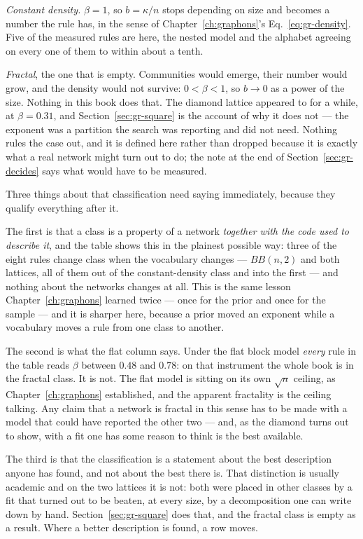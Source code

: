 \emph{Constant density.} $\beta=1$, so $b=\kappa/n$ stops depending on size and
becomes a number the rule has, in the sense of Chapter~\ref{ch:graphons}'s
Eq.~\eqref{eq:gr-density}. Five of the measured rules are here, the nested model
and the alphabet agreeing on every one of them to within about a tenth.

\emph{Fractal}, the one that is empty. Communities would emerge, their number
would grow, and the density would not survive: $0<\beta<1$, so $b\to0$ as a power
of the size. Nothing in this book does that. The diamond lattice appeared to for
a while, at $\beta=0.31$, and Section~\ref{sec:gr-square} is the account of why
it does not --- the exponent was a partition the search was reporting and did not
need. Nothing rules the case out, and it is defined here rather than dropped
because it is exactly what a real network might turn out to do; the note at the
end of Section~\ref{sec:gr-decides} says what would have to be measured.

Three things about that classification need saying immediately, because they
qualify everything after it.

The first is that a class is a property of a network \emph{together with the code
used to describe it}, and the table shows this in the plainest possible way:
three of the eight rules change class when the vocabulary changes --- $BB(n,2)$
and both lattices, all of them out of the constant-density class and into the
first --- and nothing about the networks changes at all. This is the same lesson Chapter~\ref{ch:graphons}
learned twice --- once for the prior and once for the sample --- and it is
sharper here, because a prior moved an exponent while a vocabulary moves a rule
from one class to another.

The second is what the flat column says. Under the flat block model \emph{every}
rule in the table reads $\beta$ between $0.48$ and $0.78$: on that instrument the
whole book is in the fractal class. It is not. The flat model is sitting on its
own $\sqrt n$ ceiling, as Chapter~\ref{ch:graphons} established, and the apparent
fractality is the ceiling talking. Any claim that a network is fractal in this
sense has to be made with a model that could have reported the other two --- and,
as the diamond turns out to show, with a fit one has some reason to think is the
best available.

The third is that the classification is a statement about the best description
anyone has found, and not about the best there is. That distinction is usually
academic and on the two lattices it is not: both were placed in other classes by
a fit that turned out to be beaten, at every size, by a decomposition one can
write down by hand. Section~\ref{sec:gr-square} does that, and the fractal class
is empty as a result. Where a better description is found, a row moves.

